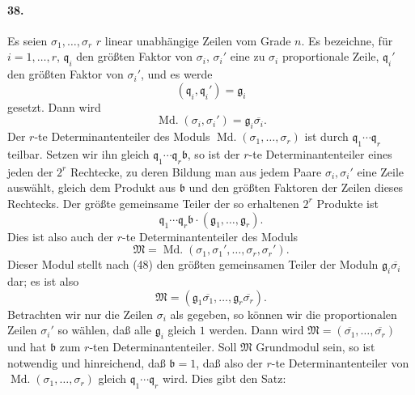 \documentclass[11pt]{article}
\newcommand{\Md}{\operatorname{Md.}}
\begin{document}
\paragraph{38.}
Es seien $\sigma_1,\ldots,\sigma_r$ $r$ linear unabhängige Zeilen vom Grade $n$. Es bezeichne, für $i=1,
\ldots,r$, $\mathfrak q_i$ den größten Faktor von $\sigma_i$, $\sigma_i'$ eine zu $\sigma_i$ proportionale Zeile, $\mathfrak q_i'$ den größten Faktor von $\sigma_i'$, und es werde
\begin{equation}
(\mathfrak q_i,\mathfrak q_i')=\mathfrak g_i
\tag{47}
\end{equation}
gesetzt. Dann wird
\begin{equation}
\Md(\sigma_i,\sigma_i')=\mathfrak g_i\overline{\sigma_i}.
\tag{48}
\end{equation}
Der $r$-te Determinantenteiler des Moduls $\Md(\sigma_1,
\ldots,
\sigma_r)$ ist durch $\mathfrak q_1\cdots\mathfrak q_r$ teilbar. Setzen wir ihn gleich $\mathfrak q_1\cdots\mathfrak q_r\mathfrak b$, so ist der $r$-te Determinantenteiler eines jeden der $2^r$ Rechtecke, zu deren Bildung man aus jedem Paare $\sigma_i,
\sigma_i'$ eine Zeile auswählt, gleich dem Produkt aus $\mathfrak b$ und den größten Faktoren der Zeilen dieses Rechtecks. Der größte gemeinsame Teiler der so erhaltenen $2^r$ Produkte ist
\begin{equation}
\mathfrak q_1\cdots\mathfrak q_r\mathfrak b\cdot(\mathfrak g_1,
\ldots,
\mathfrak g_r).
\tag{49}
\end{equation}
Dies ist also auch der $r$-te Determinantenteiler des Moduls
\begin{equation}
\mathfrak M=\Md(\sigma_1,
\sigma_1',
\ldots,
\sigma_r,
\sigma_r').
\tag{49'}
\end{equation}
Dieser Modul stellt nach (48) den größten gemeinsamen Teiler der Moduln $\mathfrak g_i\overline{\sigma_i}$ dar; es ist also
\begin{equation}
\mathfrak M=(\mathfrak g_1\overline{\sigma_1},
\ldots,
\mathfrak g_r\overline{\sigma_r}).
\tag{50}
\end{equation}
Betrachten wir nur die Zeilen $\sigma_i$ als gegeben, so können wir die proportionalen Zeilen $\sigma_i'$ so wählen, daß alle $\mathfrak g_i$ gleich $1$ werden. Dann wird $\mathfrak M=(\overline{\sigma_1},
\ldots,
\overline{\sigma_r})$ und hat $\mathfrak b$ zum $r$-ten Determinantenteiler. Soll $\mathfrak M$ Grundmodul sein, so ist notwendig und hinreichend, daß $\mathfrak b=1$, daß also der $r$-te Determinantenteiler von $\Md(\sigma_1,
\ldots,
\sigma_r)$ gleich $\mathfrak q_1\cdots\mathfrak q_r$ wird. Dies gibt den Satz:
\end{document}
